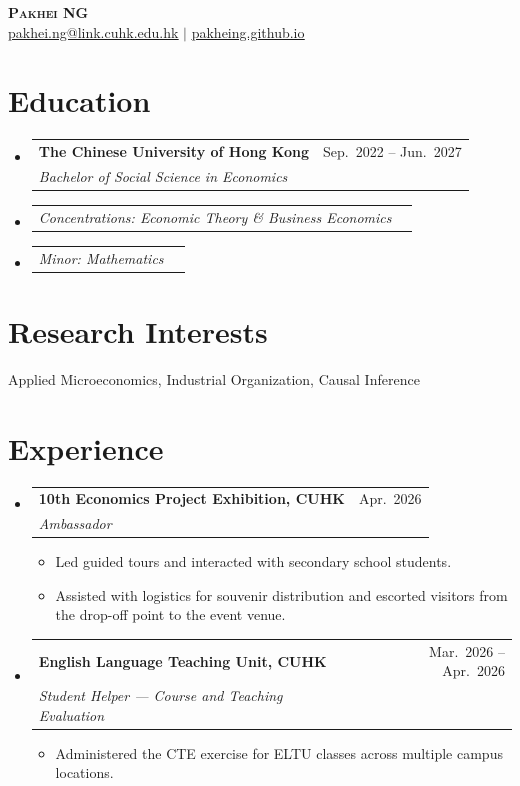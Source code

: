 \documentclass[letterpaper,11pt]{article}
\makeatletter
\newcommand{\resumeItem}[1]{
  \item\small{
    {#1 \vspace{-2pt}}
  }
}
\newcommand{\resumeSubheading}[4]{
  \vspace{-2pt}\item
    \begin{tabular*}{0.97\textwidth}[t]{l@{\extracolsep{\fill}}r}
      \textbf{#1} & #2 \\
      \textit{\small#3} & \textit{\small #4} \\
    \end{tabular*}\vspace{-7pt}
}
\newcommand{\resumeSubSubheading}[2]{
    \item
    \begin{tabular*}{0.97\textwidth}{l@{\extracolsep{\fill}}r}
      \textit{\small#1} & \textit{\small #2} \\
    \end{tabular*}\vspace{-7pt}
}
\newcommand{\resumeSubHeadingListStart}{\begin{itemize}[leftmargin=0.15in, label={}]}
\newcommand{\resumeSubHeadingListEnd}{\end{itemize}}
\newcommand{\resumeItemListStart}{\begin{itemize}}
\newcommand{\resumeItemListEnd}{\end{itemize}\vspace{-5pt}}
\makeatother
\begin{document}
\begin{center}
    \textbf{\Huge \scshape Pakhei NG} \\ \vspace{1pt}
    \small \href{mailto:pakhei.ng@link.cuhk.edu.hk}{\underline{pakhei.ng@link.cuhk.edu.hk}} $|$
    \href{https://pakheing.github.io}{\underline{pakheing.github.io}}
\end{center}

\section{Education}
  \resumeSubHeadingListStart
    \resumeSubheading
      {The Chinese University of Hong Kong}{Sep.\ 2022 -- Jun.\ 2027}
      {Bachelor of Social Science in Economics}{}
      \resumeSubSubheading
        {Concentrations: Economic Theory \& Business Economics}{}
      \resumeSubSubheading
        {Minor: Mathematics}{}
  \resumeSubHeadingListEnd

\section{Research Interests}
 \begin{itemize}[leftmargin=0.15in, label={}]
    \small{\item{
     Applied Microeconomics, Industrial Organization, Causal Inference
    }}
 \end{itemize}

\section{Experience}
  \resumeSubHeadingListStart
    \resumeSubheading
      {10th Economics Project Exhibition, CUHK}{Apr.\ 2026}
      {Ambassador}{}
      \resumeItemListStart
        \resumeItem{Led guided tours and interacted with secondary school students.}
        \resumeItem{Assisted with logistics for souvenir distribution and escorted visitors from the drop-off point to the event venue.}
      \resumeItemListEnd
    \resumeSubheading
      {English Language Teaching Unit, CUHK}{Mar.\ 2026 -- Apr.\ 2026}
      {Student Helper --- Course and Teaching Evaluation}{}
      \resumeItemListStart
        \resumeItem{Administered the CTE exercise for ELTU classes across multiple campus locations.}
      \resumeItemListEnd
  \resumeSubHeadingListEnd
\end{document}
